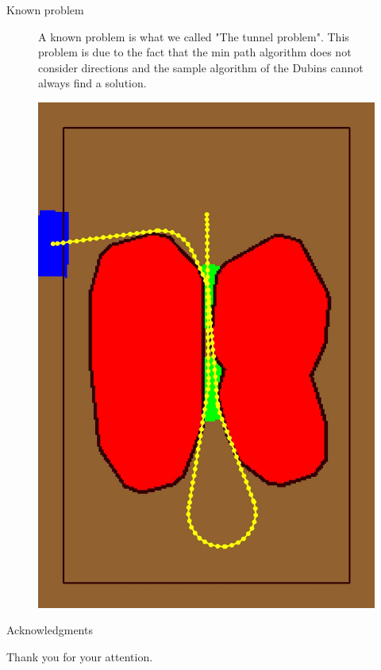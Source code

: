 \begin{frame}{Known problem}
\begin{figure}[H]
	\begin{minipage}{0.45\linewidth}
A known problem is what we called "The tunnel problem".\newline
This problem is due to the fact that the min path algorithm does not consider directions and the sample algorithm of the Dubins cannot always find a solution.  
	\end{minipage}
	\vspace{0.10\linewidth}
	\begin{minipage}{0.45\linewidth}
		\includegraphics[scale=0.13]{Immagini/polmoni}
	\end{minipage}
\end{figure}
\end{frame}

\begin{frame}{Acknowledgments}
\begin{center}
Thank you for your attention. 
\end{center}
\end{frame}

